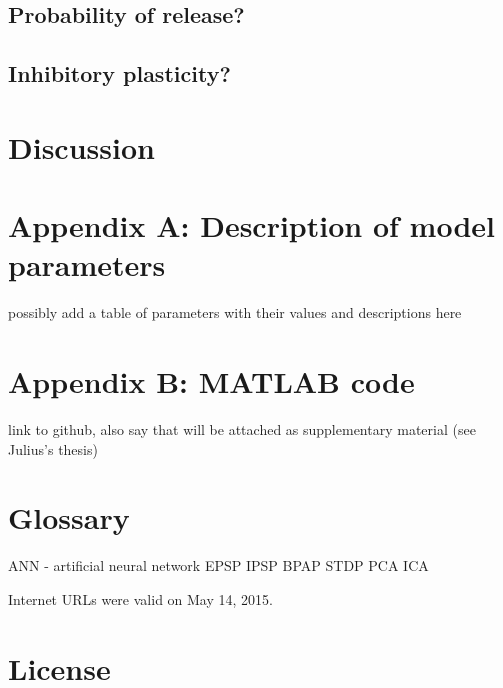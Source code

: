 \documentclass[a4paper,12pt]{report}
\theoremstyle{definition}
\begin{document}
\section{Probability of release?}

\section{Inhibitory plasticity?}


\chapter{Discussion}



\chapter*{Appendix A: Description of model parameters}

possibly add a table of parameters with their values and descriptions here

\chapter*{Appendix B: MATLAB code}

link to github, also say that will be attached as supplementary material (see Julius's thesis)


\chapter*{Glossary}
ANN - artificial neural network
EPSP
IPSP
BPAP
STDP
PCA
ICA





Internet URLs were valid on May 14, 2015.
\newpage



\chapter*{License}
\end{document}
